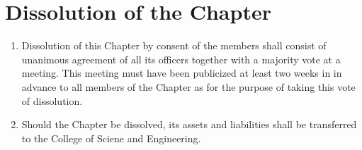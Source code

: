 \section{Dissolution of the Chapter}
\begin{enumerate}
	\item Dissolution of this Chapter by consent of the members shall consist of unanimous agreement of all its officers together with a majority vote at a meeting. This meeting must have been publicized at least two weeks in in advance to all members of the Chapter as for the purpose of taking this vote of dissolution.
	\item Should the Chapter be dissolved, its assets and liabilities shall be transferred to the College of Sciene and Engineering.

\end{enumerate}



